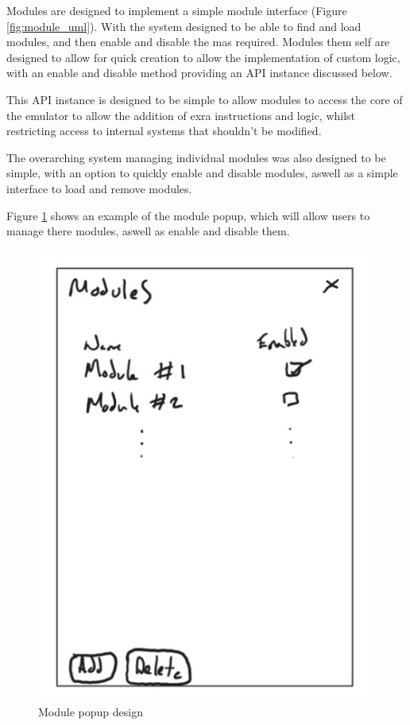 Modules are designed to implement a simple module interface (Figure \ref{fig:module_uml}). With the system designed to be able to find and load modules, and then enable and disable the mas required. Modules them self are designed to allow for quick creation to allow the implementation of custom logic, with an enable and disable method providing an API instance discussed below.

This API instance is designed to be simple to allow modules to access the core of the emulator to allow the addition of exra instructions and logic, whilst restricting access to internal systems that shouldn't be modified. 

The overarching system managing individual modules was also designed to be simple, with an option to quickly enable and disable modules, aswell as a simple interface to load and remove modules.

Figure \ref{fig:module_popup} shows an example of the module popup, which will allow users to manage there modules, aswell as enable and disable them.

\begin{figure}[H]
    \centering
    \includegraphics[width=0.7\linewidth]{dissertation/DATA/module design.jpg}
    \caption{Module popup design}
    \label{fig:module_popup}
\end{figure}


